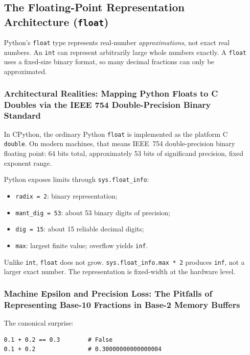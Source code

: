\subsection{The Floating-Point Representation Architecture (\texttt{float})}

Python's \texttt{float} type represents real-number \emph{approximations}, not exact real numbers. An \texttt{int} can represent arbitrarily large whole numbers exactly. A \texttt{float} uses a fixed-size binary format, so many decimal fractions can only be approximated.

\subsubsection{Architectural Realities: Mapping Python Floats to C Doubles via the IEEE 754 Double-Precision Binary Standard}

In CPython, the ordinary Python \texttt{float} is implemented as the platform C \texttt{double}. On modern machines, that means IEEE~754 double-precision binary floating point: 64 bits total, approximately 53 bits of significand precision, fixed exponent range.

Python exposes limits through \texttt{sys.float\_info}:

\begin{itemize}
    \item \texttt{radix = 2}: binary representation;
    \item \texttt{mant\_dig = 53}: about 53 binary digits of precision;
    \item \texttt{dig = 15}: about 15 reliable decimal digits;
    \item \texttt{max}: largest finite value; overflow yields \texttt{inf}.
\end{itemize}

Unlike \texttt{int}, \texttt{float} does not grow. \texttt{sys.float\_info.max * 2} produces \texttt{inf}, not a larger exact number. The representation is fixed-width at the hardware level.

\subsubsection{Machine Epsilon and Precision Loss: The Pitfalls of Representing Base-10 Fractions in Base-2 Memory Buffers}

The canonical surprise:

\begin{verbatim}
0.1 + 0.2 == 0.3        # False
0.1 + 0.2               # 0.30000000000000004
\end{verbatim}

